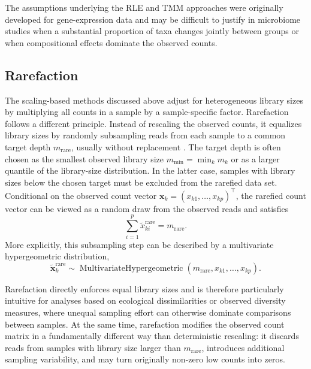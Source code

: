 The assumptions underlying the RLE and TMM approaches were originally developed for gene-expression data and may be difficult to justify in microbiome studies when a substantial proportion of taxa changes jointly between groups or when compositional effects dominate the observed counts.

\subsection{Rarefaction}
\label{sec:2micro:norm:rarefaction}

The scaling-based methods discussed above adjust for heterogeneous library sizes by multiplying all counts in a sample by a sample-specific factor. Rarefaction follows a different principle. Instead of rescaling the observed counts, it equalizes library sizes by randomly subsampling reads from each sample to a common target depth $m_{\mathrm{rare}}$, usually without replacement \citep{mcmurdie2014waste}. The target depth is often chosen as the smallest observed library size $m_{\min}=\min_k m_k$ or as a larger quantile of the library-size distribution. In the latter case, samples with library sizes below the chosen target must be excluded from the rarefied data set. Conditional on the observed count vector $\mathbf{x}_k=(x_{k1},\ldots,x_{kp})^\top$, the rarefied count vector can be viewed as a random draw from the observed reads and satisfies
\begin{equation}
\sum_{i=1}^p \tilde{x}^{\mathrm{rare}}_{ki} = m_{\mathrm{rare}}.
\end{equation}
More explicitly, this subsampling step can be described by a multivariate hypergeometric distribution,
\begin{equation}
\tilde{\mathbf{x}}^{\mathrm{rare}}_k \sim \operatorname{MultivariateHypergeometric}\left(m_{\mathrm{rare}},x_{k1},\ldots,x_{kp}\right).
\end{equation}

Rarefaction directly enforces equal library sizes and is therefore particularly intuitive for analyses based on ecological dissimilarities or observed diversity measures, where unequal sampling effort can otherwise dominate comparisons between samples. At the same time, rarefaction modifies the observed count matrix in a fundamentally different way than deterministic rescaling: it discards reads from samples with library size larger than $m_{\mathrm{rare}}$, introduces additional sampling variability, and may turn originally non-zero low counts into zeros.

